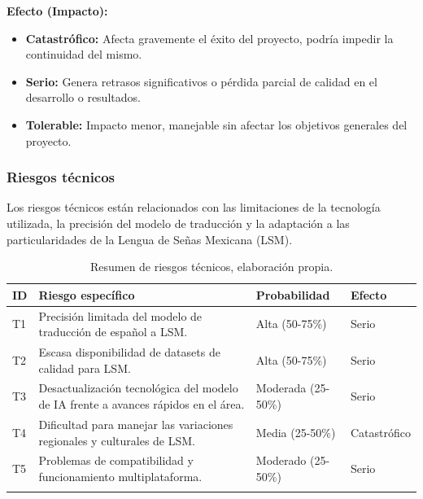 \textbf{Efecto (Impacto):}
\begin{itemize}
	\item \textbf{Catastrófico:} Afecta gravemente el éxito del proyecto, podría impedir la continuidad del mismo.
	\item \textbf{Serio:} Genera retrasos significativos o pérdida parcial de calidad en el desarrollo o resultados.
	\item \textbf{Tolerable:} Impacto menor, manejable sin afectar los objetivos generales del proyecto.
\end{itemize}


\subsubsection{Riesgos técnicos}
Los riesgos técnicos están relacionados con las limitaciones de la tecnología utilizada, la precisión del modelo de traducción y la adaptación a las particularidades de la Lengua de Señas Mexicana (LSM).

\setlength{\tabcolsep}{4pt}
\renewcommand{\arraystretch}{1.2}

\begin{longtable}{|>{\centering\arraybackslash}p{0.8cm}|>{\raggedright\arraybackslash}p{3.5cm}|>{\raggedright\arraybackslash}p{5.1cm}|>{\raggedright\arraybackslash}p{5.1cm}|}
	\hline
	\textbf{ID} & \textbf{Riesgo específico} & \textbf{Probabilidad} & \textbf{Efecto} \\
	\hline
	T1 & Precisión limitada del modelo de traducción de español a LSM. & Alta (50-75\%) & Serio \\
	\hline
	T2 & Escasa disponibilidad de datasets de calidad para LSM. & Alta (50-75\%) & Serio \\
	\hline
	T3 & Desactualización tecnológica del modelo de IA frente a avances rápidos en el área. & Moderada (25-50\%) & Serio \\
	\hline
	T4 & Dificultad para manejar las variaciones regionales y culturales de LSM. & Media (25-50\%) & Catastrófico \\
	\hline
	T5 & Problemas de compatibilidad y funcionamiento multiplataforma. & Moderado (25-50\%) & Serio \\
	\hline
\caption[Resumen de riesgos técnicos]{Resumen de riesgos técnicos, elaboración propia.} \label{tab:riesgos_tecnicos_resumen} \\

\end{longtable}

